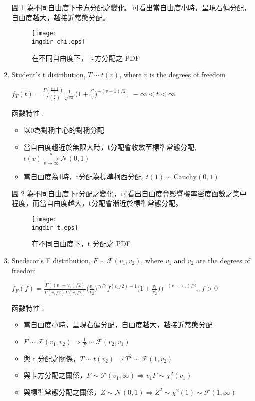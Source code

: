 \begin{enumerate}
圖 \ref{fig:chi} 為不同自由度下卡方分配之變化。可看出當自由度小時，呈現右偏分配，自由度越大，越接近常態分配。

\begin{figure}[H]
    \centering
        \texttt{[image: \\imgdir chi.eps]}
    \caption{在不同自由度下，卡方分配之 PDF}
    \label{fig:chi}
\end{figure}

\item
Student's t distribution, $T \sim t(v)$, where $v$ is the degrees of freedom 
\vspace{0.2cm}

$\displaystyle f_T(t) = \frac{\Gamma(\frac{v+1}{2})}{\Gamma(\frac{v}{2})}\frac{1}{\sqrt{v\pi}}\bigg(1 + \frac{t^2}{v}\bigg)^{-(v+1)/2},\,\, -\infty < t < \infty$
\vspace{0.2cm}

函數特性 : 
\begin{itemize}
\item
以0為對稱中心的對稱分配
\item
當自由度趨近於無限大時，t分配會收斂至標準常態分配, $t(v) \xrightarrow[v \to \infty]{d} \mathcal{N}(0, 1)$
\item
當自由度為1時，t分配為標準柯西分配, $t(1) \sim \text{Cauchy}(0, 1)$
\end{itemize}

圖 \ref{fig:t} 為不同自由度下t分配之變化，可看出自由度會影響機率密度函數之集中程度，而當自由度越大，t分配會漸近於標準常態分配。

\begin{figure}[H]
    \centering
        \texttt{[image: \\imgdir t.eps]}
    \caption{在不同自由度下，t 分配之 PDF}
    \label{fig:t}
\end{figure}

\item
Snedecor's F distribution, $F \sim \mathcal{F}(v_1, v_2)$, where $v_1$ and $v_2$ are the degrees of freedom 
\vspace{-0.4cm}

$\displaystyle f_F(f) = \frac{\Gamma((v_1+v_2)/2)}{\Gamma(v_1/2)\Gamma(v_2/2)}\bigg(\frac{v_1}{v_2}\bigg)^{v_1/2}f^{(v_1/2)-1}\bigg(1 + \frac{v_1}{v_2}f\bigg)^{-(v_1+v_2)/2},\,\, f > 0$
\vspace{0.2cm}

函數特性 : 
\begin{itemize}
\item
當自由度小時，呈現右偏分配，自由度越大，越接近常態分配
\item
$\displaystyle F \sim \mathcal{F}(v_1, v_2) \Longrightarrow \frac{1}{F} \sim \mathcal{F}(v_2, v_1)$
\item
與 t 分配之關係，$T \sim t(v_2) \Longrightarrow T^2 \sim \mathcal{F}(1, v_2)$
\item
與卡方分配之關係，$F \sim \mathcal{F}(v_1, \infty) \Longrightarrow v_1F \sim \chi^2(v_1)$
\item
與標準常態分配之關係，$Z \sim \mathcal{N}(0, 1) \Longrightarrow Z^2 \sim \chi^2(1) \sim \mathcal{F}(1, \infty)$
\end{itemize}


\end{enumerate}
